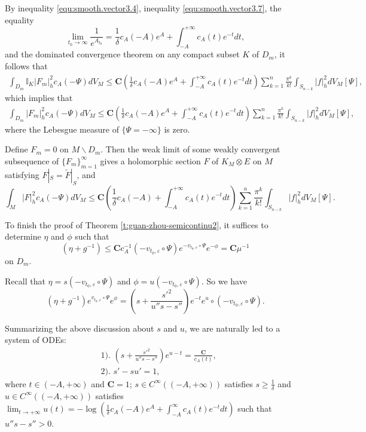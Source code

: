 By inequality \ref{equ:smooth.vector3.4}, inequality
\ref{equ:smooth.vector3.7}, the equality
$$\lim_{t_{0}\to\infty}\frac{1}{e^{A_{t_0}}}=\frac{1}{\delta}c_{A}(-A)e^A+\int_{-A}^{+\infty}c_{A}(t)e^{-t}dt,$$
and the dominated convergence theorem on any compact subset $K$ of
$D_m$, it follows that
\begin{equation}
\begin{split}
\int_{D_m}\mathbb{I}_{K}|F_{m}|^{2}_{h}c_{A}(-\Psi)dV_{M}
\leq\mathbf{C}(\frac{1}{\delta}c_{A}(-A)e^A+\int_{-A}^{+\infty}c_{A}
(t)e^{-t}dt)\sum_{k=1}^{n}\frac{\pi^{k}}{k!}\int_{S_{n-k}}|f|^{2}_{h}dV_{M}[\Psi],
\end{split}
\end{equation}
which implies that
\begin{equation}
\begin{split}
\int_{ D_m}|F_{m}|^{2}_{h}c_{A}(-\Psi)dV_{M}
\leq\mathbf{C}(\frac{1}{\delta}c_{A}(-A)e^A+
\int_{-A}^{+\infty}c_{A}(t)e^{-t}dt)\sum_{k=1}^{n}\frac{\pi^{k}}{k!}\int_{S_{n-k}}|f|^{2}_{h}dV_{M}[\Psi],
\end{split}
\end{equation}
where the Lebesgue measure of $\{\Psi=-\infty\}$ is zero.

Define $F_m=0$ on $M\backslash D_m$. Then the weak limit of some
weakly convergent subsequence of $\{F_m\}_{m=1}^\infty$ gives a
holomorphic section $F$ of $K_{M}\otimes E$ on $M$ satisfying
$F|_{S}=\tilde{F}|_{S}$, and
$$\int_{ M}|F|^{2}_{h}c_{A}(-\Psi)dV_{M}
\leq\mathbf{C}(\frac{1}
{\delta}c_{A}(-A)+\int_{-A}^{+\infty}c_{A}(t)e^{-t}dt)\sum_{k=1}^{n}
\frac{\pi^{k}}{k!}\int_{S_{n-k}}|f|^{2}_{h}dV_{M}[\Psi].$$

To finish the proof of Theorem \ref{t:guan-zhou-semicontinu2}, it
suffices to determine $\eta$ and $\phi$ such that 
$$(\eta+g^{-1})\leq
\mathbf{C}c^{-1}_{A}(-v_{t_0,\varepsilon}\circ\Psi)e^{-v_{t_0,\varepsilon}\circ\Psi}e^{-\phi}=\mathbf{C}\mu^{-1}$$
on $D_m$.

Recall that $\eta=s(-v_{t_0,\varepsilon}\circ\Psi)$ and
$\phi=u(-v_{t_0,\varepsilon}\circ\Psi)$. So we have 
$$(\eta+g^{-1})
e^{v_{t_0,\varepsilon}\circ\Psi}e^{\phi}=(s+\frac{s'^{2}}{u''s-s''})e^{-t}e^{u}\circ(-v_{t_0,\varepsilon}\circ\Psi).$$

Summarizing the above discussion about $s$ and $u$, we are naturally
led to a system of ODEs:
\begin{equation}
\label{equ:unify2.GZ_unify}
\begin{split}
&1).\,\,(s+\frac{s'^{2}}{u''s-s''})e^{u-t}=\frac{\mathbf{C}}{c_{A}(t)}, \\
&2).\,\,s'-su'=1,
\end{split}
\end{equation}
where $t\in(-A,+\infty)$ and $\mathbf{C}=1$; $s\in
C^{\infty}((-A,+\infty))$ satisfies $s\geq \frac{1}{\delta}$ and
$u\in C^{\infty}((-A,+\infty))$ satisfies
$\lim_{t\to+\infty}u(t)=-\log(\frac{1}{\delta}c_{A}(-A)e^{A}+\int_{-A}^{\infty}c_{A}(t)e^{-t}dt)$
such that $u''s-s''>0$.

